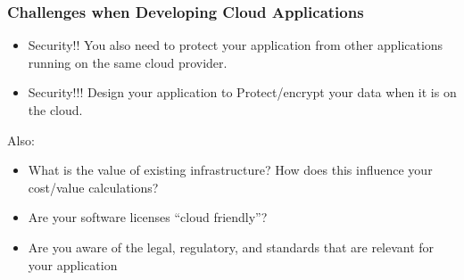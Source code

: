 \documentclass[10pt]{beamer}
\begin{document}
\begin{frame}[t]
\frametitle{Challenges when Developing Cloud Applications}

\begin{itemize}
\item Security!! You also need to protect your application from other applications running on the same cloud provider.
\item Security!!! Design your application to Protect/encrypt your data when it is on the cloud.
\end{itemize}

Also:
\begin{itemize}
\item What is the value of existing infrastructure? How does this influence your cost/value calculations?
\item Are your software licenses ``cloud friendly''?
\item Are you aware of the legal, regulatory, and standards that are relevant for your application
\end{itemize}
\end{frame}
\end{document}

